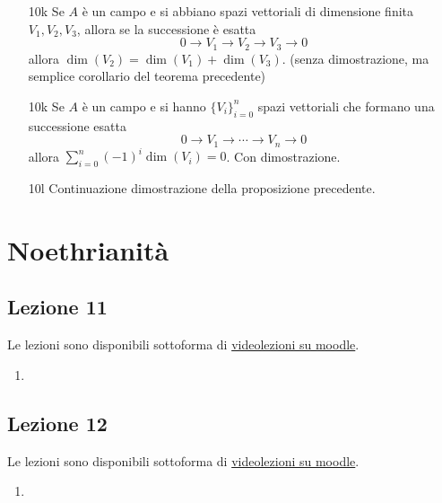 \documentclass[italian]{article}
\begin{document}
\begin{enumerate}
      \item[10k] Se $A$ è un campo e si abbiano spazi vettoriali di dimensione
        finita $V_1, V_2, V_3$, allora se la successione è esatta 
        \begin{equation*}
          0 \to V_1 \to  V_2 \to V_3 \to 0
        \end{equation*}
        allora $\dim(V_2) = \dim(V_1) + \dim(V_3)$. (senza dimostrazione, ma
        semplice corollario del teorema precedente)
      \item[10k] Se $A$ è un campo e si hanno $\{V_i\}_{i = 0}^n$ 
     	spazi vettoriali che formano una successione esatta 
        \begin{equation*}
          0 \to V_1 \to \cdots \to V_n \to 0
        \end{equation*}
        allora $\sum_{i = 0}^n (-1)^i \dim(V_i) = 0$. Con dimostrazione. 
      \item[10l] Continuazione dimostrazione della proposizione precedente.
    \end{enumerate}   
    
    \section{Noethrianità}
    
    \subsection{Lezione 11}

	Le lezioni sono disponibili sottoforma di 
	\href{https://didatticaonline.unitn.it/dol/course/view.php?id=23268}{videolezioni
		su moodle}.
	
	\begin{enumerate}
		\item 
	\end{enumerate}   

    \subsection{Lezione 12}

	Le lezioni sono disponibili sottoforma di 
	\href{https://didatticaonline.unitn.it/dol/course/view.php?id=23268}{videolezioni
		su moodle}.
	
	\begin{enumerate}
		\item 
	\end{enumerate}
   
\end{document}

